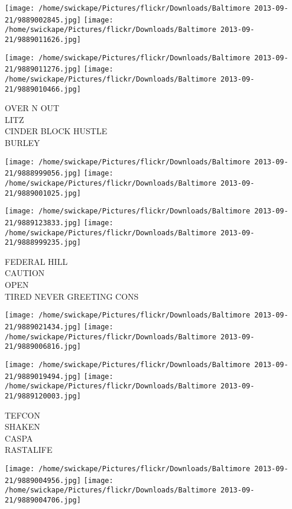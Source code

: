 \documentclass[10pt,letterpaper]{article}
\begin{document}
\texttt{[image: /home/swickape/Pictures/flickr/Downloads/Baltimore 2013-09-21/9889002845.jpg]}
\texttt{[image: /home/swickape/Pictures/flickr/Downloads/Baltimore 2013-09-21/9889011626.jpg]}

\texttt{[image: /home/swickape/Pictures/flickr/Downloads/Baltimore 2013-09-21/9889011276.jpg]}
\texttt{[image: /home/swickape/Pictures/flickr/Downloads/Baltimore 2013-09-21/9889010466.jpg]}

OVER N OUT\\
LITZ\\
CINDER BLOCK HUSTLE\\
BURLEY\\
\pagebreak

\texttt{[image: /home/swickape/Pictures/flickr/Downloads/Baltimore 2013-09-21/9888999056.jpg]}
\texttt{[image: /home/swickape/Pictures/flickr/Downloads/Baltimore 2013-09-21/9889001025.jpg]}

\texttt{[image: /home/swickape/Pictures/flickr/Downloads/Baltimore 2013-09-21/9889123833.jpg]}
\texttt{[image: /home/swickape/Pictures/flickr/Downloads/Baltimore 2013-09-21/9888999235.jpg]}

FEDERAL HILL\\
CAUTION\\
OPEN\\
TIRED NEVER GREETING CONS\\
\pagebreak

\texttt{[image: /home/swickape/Pictures/flickr/Downloads/Baltimore 2013-09-21/9889021434.jpg]}
\texttt{[image: /home/swickape/Pictures/flickr/Downloads/Baltimore 2013-09-21/9889006816.jpg]}

\texttt{[image: /home/swickape/Pictures/flickr/Downloads/Baltimore 2013-09-21/9889019494.jpg]}
\texttt{[image: /home/swickape/Pictures/flickr/Downloads/Baltimore 2013-09-21/9889120003.jpg]}

TEFCON\\
SHAKEN\\
CASPA\\
RASTALIFE\\
\pagebreak

\texttt{[image: /home/swickape/Pictures/flickr/Downloads/Baltimore 2013-09-21/9889004956.jpg]}
\texttt{[image: /home/swickape/Pictures/flickr/Downloads/Baltimore 2013-09-21/9889004706.jpg]}
\end{document}
